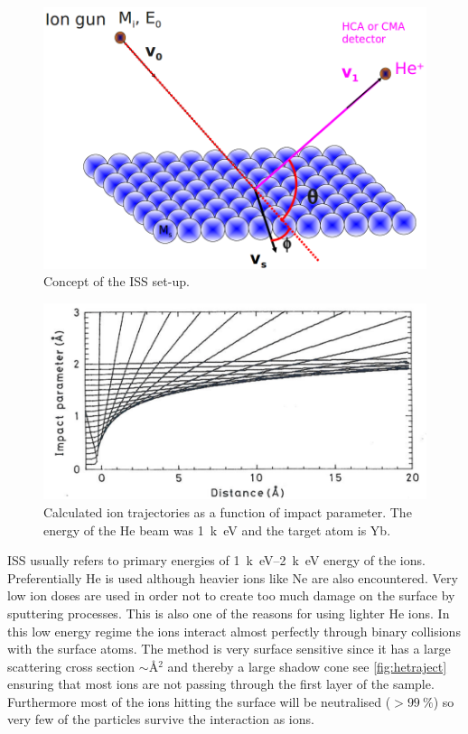 \begin{figure}[h!]
	\begin{center}
	\includegraphics[scale=0.4]{figures/iss_ny_udg_11_01.png}
	\caption{Concept of the ISS set-up.}
	\label{fig:isssetup}
	\end{center}
\end{figure}

\begin{figure}[h!]
	\begin{center}
	\includegraphics[scale=4]{figures/11_02.png}
	\caption{Calculated  ion trajectories as a function of impact parameter. The energy of the He beam was \SI{1}{k\electronvolt} and the target atom is Yb.}
	\label{fig:hetraject}
	\end{center}
\end{figure}

ISS usually refers to primary energies of \SIrange{1}{2}{k\electronvolt} energy of the ions. Preferentially He is used although heavier ions like Ne are also encountered. Very low ion doses are used in order not to create too much damage on the surface by sputtering processes. This is also one of the reasons for using lighter He ions. In this low  energy regime the ions interact almost perfectly through binary collisions with the surface atoms. The method is very surface sensitive since it has a large scattering cross section $\sim \si{\angstrom^2}$ and thereby a large shadow cone see \autoref{fig:hetraject} ensuring that most ions are not passing through the first layer of the sample. Furthermore most of the ions hitting the surface will be neutralised ($>\SI{99}{\percent}$) so very few of the particles survive the interaction as ions.

